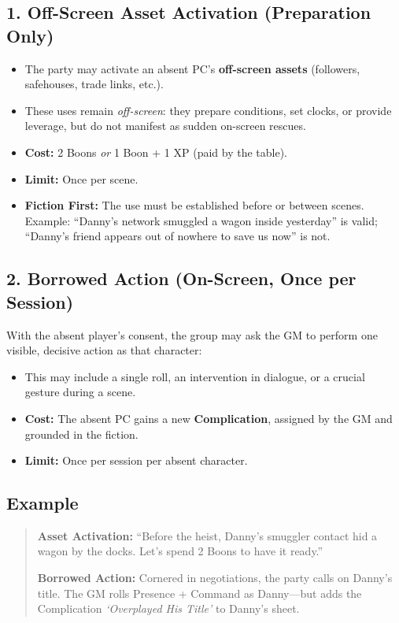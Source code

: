 \documentclass[12pt]{book}
\begin{document}
\subsection*{1. Off-Screen Asset Activation (Preparation Only)}
\begin{itemize}
  \item The party may activate an absent PC’s \textbf{off-screen assets} (followers, safehouses, trade links, etc.).
  \item These uses remain \emph{off-screen}: they prepare conditions, set clocks, or provide leverage, but do not manifest as sudden on-screen rescues.
  \item \textbf{Cost:} 2 Boons \emph{or} 1 Boon + 1 XP (paid by the table).
  \item \textbf{Limit:} Once per scene.
  \item \textbf{Fiction First:} The use must be established before or between scenes. Example: “Danny’s network smuggled a wagon inside yesterday” is valid; “Danny’s friend appears out of nowhere to save us now” is not.
\end{itemize}

\subsection*{2. Borrowed Action (On-Screen, Once per Session)}
With the absent player’s consent, the group may ask the GM to perform one visible, decisive action as that character:
\begin{itemize}
  \item This may include a single roll, an intervention in dialogue, or a crucial gesture during a scene.
  \item \textbf{Cost:} The absent PC gains a new \textbf{Complication}, assigned by the GM and grounded in the fiction.
  \item \textbf{Limit:} Once per session per absent character.
\end{itemize}

\subsection*{Example}
\begin{quote}
\textbf{Asset Activation:} “Before the heist, Danny’s smuggler contact hid a wagon by the docks. Let’s spend 2 Boons to have it ready.”  

\textbf{Borrowed Action:} Cornered in negotiations, the party calls on Danny’s title. The GM rolls Presence + Command as Danny—but adds the Complication \emph{‘Overplayed His Title’} to Danny’s sheet.
\end{quote}
\end{document}
